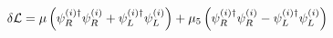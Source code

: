 \begin{equation}
\delta {\cal L} = \mu \left( \psi_R^{(i)\dagger} \psi_R^{(i)} +\psi_L^{(i)\dagger} \psi_L^{(i)}\right)
+ \mu_5  \left( \psi_R^{(i)\dagger} \psi_R^{(i)} - \psi_L^{(i)\dagger} \psi_L^{(i)}\right)
\label{eq8p}
\end{equation}

